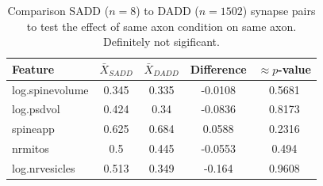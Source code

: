 \documentclass[12pt]{article}
\theoremstyle{definition}
\begin{document}
\begin{table}[tb]
  \caption{Comparison SADD ($n=8$) to DADD ($n=1502$) synapse pairs to test the effect of same axon condition on same axon. Definitely not sigificant.  }
  \label{tab:dasdVSdadd}
  \begin{center}
    \begin{tabular}{l|cccc}
    \hline

    \hline
Feature                  & $\bar{X}_{SADD}$ & $\bar{X}_{DADD}$ & Difference & $\approx p$-value  \\
    \hline
log.spinevolume & 0.345 & 0.335 & -0.0108 & 0.5681 \\ 
log.psdvol & 0.424 & 0.34 & -0.0836 & 0.8173 \\ 
spineapp & 0.625 & 0.684 & 0.0588 & 0.2316 \\ 
nrmitos & 0.5 & 0.445 & -0.0553 & 0.494 \\ 
log.nrvesicles & 0.513 & 0.349 & -0.164 & 0.9608 \\ 
    \hline
    \end{tabular}
  \end{center}
\end{table}
\end{document}
